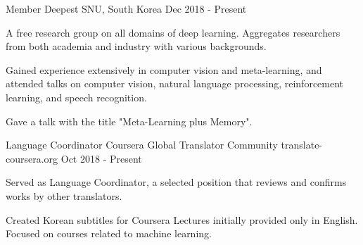 

\begin{cventries}

  \cventry
    {Member} %
    {Deepest} %
    {SNU, South Korea} %
    {Dec 2018 - Present} %
    {
      \begin{cvitems} %
        \item {A free research group on all domains of deep learning. Aggregates researchers from both academia and industry with various backgrounds.}
        \item {Gained experience extensively in computer vision and meta-learning, and attended talks on computer vision, natural language processing, reinforcement learning, and speech recognition.}
        \item {Gave a talk with the title "Meta-Learning plus Memory".}
      \end{cvitems}
    }

  \cventry
    {Language Coordinator} %
    {Coursera Global Translator Community} %
    {translate-coursera.org} %
    {Oct 2018 - Present} %
    {
      \begin{cvitems} %
        \item {Served as Language Coordinator, a selected position that reviews and confirms works by other translators.}
        \item {Created Korean subtitles for Coursera Lectures initially provided only in English. Focused on courses related to machine learning.}
      \end{cvitems}
    }

\end{cventries}
